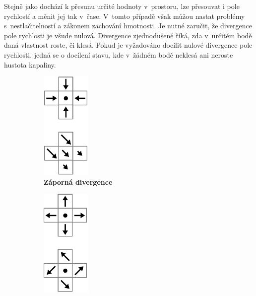 Stejně jako dochází k přesunu určité hodnoty v~prostoru, lze přesouvat i pole rychlostí a měnit jej tak v~čase. V~tomto případě však můžou nastat problémy s~nestlačitelností a zákonem zachování hmotnosti. Je nutné zaručit, že divergence pole rychlosti je všude nulová. Divergence zjednodušeně říká, zda v~určitém bodě daná vlastnost roste, či klesá. Pokud je vyžadováno docílit nulové divergence pole rychlosti, jedná se o docílení stavu, kde v~žádném bodě neklesá ani neroste hustota kapaliny. \cite{webglFluid}

\begin{figure}[h]
	\captionsetup{justification=centering}
	\centering
	\begin{subfigure}{.3\textwidth}
		\centering
		\includegraphics[width=0.35\linewidth]{obrazky-figures/div-negative.png}
		\caption{\textbf{Záporná divergence}}
		\label{fig:divPlus}
	\end{subfigure}%
	\begin{subfigure}{.3\textwidth}
		\centering
		\includegraphics[width=0.35\linewidth]{obrazky-figures/div-positive.png}

\end{subfigure}
\end{figure}
